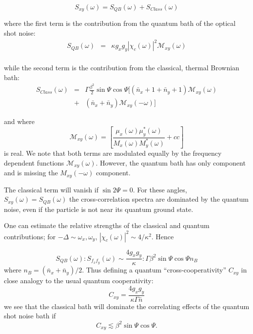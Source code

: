 \documentclass[twocolumn,english,notitlepage,superscriptaddress,nofootinbib]{revtex4-2}
\begin{document}
\begin{equation}
  S_{xy} (\omega) =S_{QB}(\omega)+ S_{Class}(\omega) 
\label{Corr2}
\end{equation}

where the first term is the contribution from the quantum bath of the optical shot noise:
\begin{eqnarray}
  S_{QB}(\omega)&=& \kappa g_xg_y |\chi_c(\omega)|^2 \mathcal{M}_{xy}(\omega)   \nonumber \\
  \end{eqnarray}
  
  while the second term is the contribution from the classical,  thermal Brownian bath:
  \begin{eqnarray}
  S_{Class}(\omega)&=&   \Gamma \frac{\beta^2}{2} \sin \Psi \cos \Psi [ (\bar{n}_x+1+ \bar{n}_y+1)\mathcal{M}_{xy}(\omega) \nonumber \\
   & + & (\bar{n}_x+ \bar{n}_y)\mathcal{M}_{xy}(-\omega) ]
   \label{QLTCorr}
\end{eqnarray}


and where 
\begin{equation}
 \mathcal{M}_{xy}(\omega)=\left[ \frac{\mu_x(\omega)\mu_y^*(\omega)}{M_x(\omega)M_y^*(\omega)} + cc\right]
\end{equation}
is real.  We note that both terms are modulated equally by the frequency dependent functions $\mathcal{M}_{xy}(\omega)$.  However, the quantum bath has only component  and is missing the $M_{xy}(-\omega)$ component.

The classical term will vanish if $\sin 2\Psi=0$.  For these angles,  $S_{xy} (\omega) =S_{QB}(\omega)$ the cross-correlation spectra
are dominated by the quantum noise,  even if the particle is not near its quantum ground state. 

One can estimate the relative strengths of the classical and quantum contributions; for $-\Delta \sim \omega_x,\omega_y$, $|\chi_c(\omega)|^2\sim 4/\kappa^2$. Hence

\begin{equation}
 S_{QB}(\omega): S_{f_x f_y}(\omega) \sim \frac{4g_xg_y}{\kappa}:\Gamma \beta^2\sin \Psi \cos \Psi n_B
\end{equation}
where $ n_B= (\bar{n}_x+ \bar{n}_y)/2$. Thus defining a quantum ``cross-cooperativity'' $C_{xy}$ in close analogy to the usual quantum cooperativity:
\begin{equation}
 C_{xy}= \frac{4g_xg_y}{\kappa\Gamma \bar{n}}
\end{equation}
we see that the classical bath will dominate the correlating effects of the quantum shot noise bath if
\begin{equation}
 C_{xy} \lesssim \beta^2 \sin \Psi \cos \Psi.
\end{equation}
\end{document}
